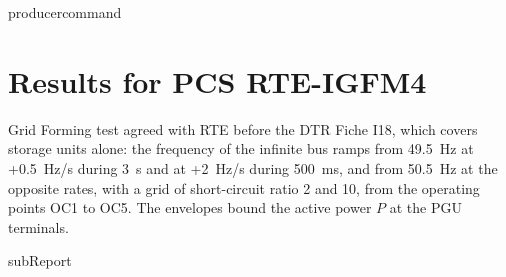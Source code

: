 {{ producercommand }}



    \section{Results for PCS RTE-IGFM4}

    Grid Forming test agreed with RTE before the DTR Fiche I18, which covers storage units
    alone: the frequency of the infinite bus ramps from 49.5~Hz at +0.5~Hz/s
    during 3~s and at +2~Hz/s during 500~ms, and from 50.5~Hz at the opposite rates, with a grid
    of short-circuit ratio 2 and 10, from the operating points OC1 to OC5. The envelopes bound
    the active power \(P\) at the PGU terminals.

    {{subReport}}
    \newpage
